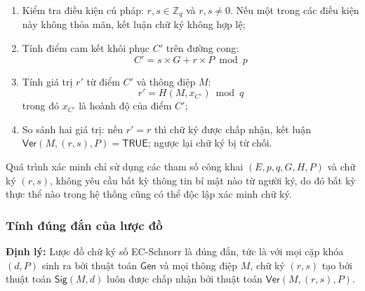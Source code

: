 \begin{enumerate}
    \item Kiểm tra điều kiện cú pháp: $r, s \in \mathbb{Z}_q$ và $r, s \neq 0$. Nếu một trong các điều kiện này không thỏa mãn, kết luận chữ ký không hợp lệ;
    \item Tính điểm cam kết khôi phục $C'$ trên đường cong:
    \begin{equation}
        C' = s \times G + r \times P \bmod p
        \label{eq:ec-schnorr-verify-c}
    \end{equation}
    \item Tính giá trị $r'$ từ điểm $C'$ và thông điệp $M$:
    \begin{equation}
        r' = H(M, x_{C'}) \bmod q
        \label{eq:ec-schnorr-verify-r}
    \end{equation}
    trong đó $x_{C'}$ là hoành độ của điểm $C'$;
    \item So sánh hai giá trị: nếu $r' = r$ thì chữ ký được chấp nhận, kết luận $\textsf{Ver}(M, (r,s), P) = \textsf{TRUE}$; ngược lại chữ ký bị từ chối.
\end{enumerate}

Quá trình xác minh chỉ sử dụng các tham số công khai $(E, p, q, G, H, P)$ và chữ ký $(r,s)$, không yêu cầu bất kỳ thông tin bí mật nào từ người ký, do đó bất kỳ thực thể nào trong hệ thống cũng có thể độc lập xác minh chữ ký.

\subsubsection{Tính đúng đắn của lược đồ}

\textbf{Định lý:} Lược đồ chữ ký số EC-Schnorr là đúng đắn, tức là với mọi cặp khóa $(d, P)$ sinh ra bởi thuật toán $\textsf{Gen}$ và mọi thông điệp $M$, chữ ký $(r, s)$ tạo bởi thuật toán $\textsf{Sig}(M, d)$ luôn được chấp nhận bởi thuật toán $\textsf{Ver}(M, (r,s), P)$.

